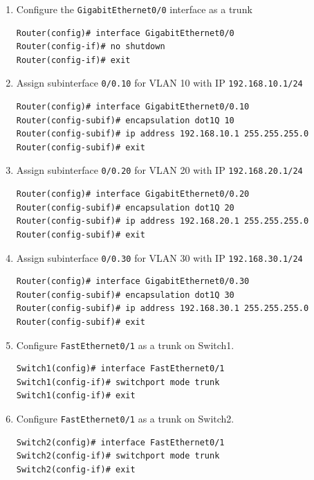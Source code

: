 \documentclass[a4paper]{book}
\begin{document}
\begin{enumerate}
\item{Configure the \texttt{GigabitEthernet0/0} interface as a trunk}

\begin{lstlisting}
Router(config)# interface GigabitEthernet0/0
Router(config-if)# no shutdown
Router(config-if)# exit
\end{lstlisting}

\item{Assign subinterface \texttt{0/0.10} for VLAN 10 with IP \texttt{192.168.10.1/24}}

\begin{lstlisting}
Router(config)# interface GigabitEthernet0/0.10
Router(config-subif)# encapsulation dot1Q 10
Router(config-subif)# ip address 192.168.10.1 255.255.255.0
Router(config-subif)# exit
\end{lstlisting}

\item{Assign subinterface \texttt{0/0.20} for VLAN 20 with IP \texttt{192.168.20.1/24}}

\begin{lstlisting}
Router(config)# interface GigabitEthernet0/0.20
Router(config-subif)# encapsulation dot1Q 20
Router(config-subif)# ip address 192.168.20.1 255.255.255.0
Router(config-subif)# exit
\end{lstlisting}

\item{Assign subinterface \texttt{0/0.30} for VLAN 30 with IP \texttt{192.168.30.1/24}}

\begin{lstlisting}
Router(config)# interface GigabitEthernet0/0.30
Router(config-subif)# encapsulation dot1Q 30
Router(config-subif)# ip address 192.168.30.1 255.255.255.0
Router(config-subif)# exit
\end{lstlisting}



\item{Configure \texttt{FastEthernet0/1} as a trunk on Switch1.}

\begin{lstlisting}
Switch1(config)# interface FastEthernet0/1
Switch1(config-if)# switchport mode trunk
Switch1(config-if)# exit
\end{lstlisting}

\item{Configure \texttt{FastEthernet0/1} as a trunk on Switch2.}
\begin{lstlisting}
Switch2(config)# interface FastEthernet0/1
Switch2(config-if)# switchport mode trunk
Switch2(config-if)# exit
\end{lstlisting}


\end{enumerate}
\end{document}
